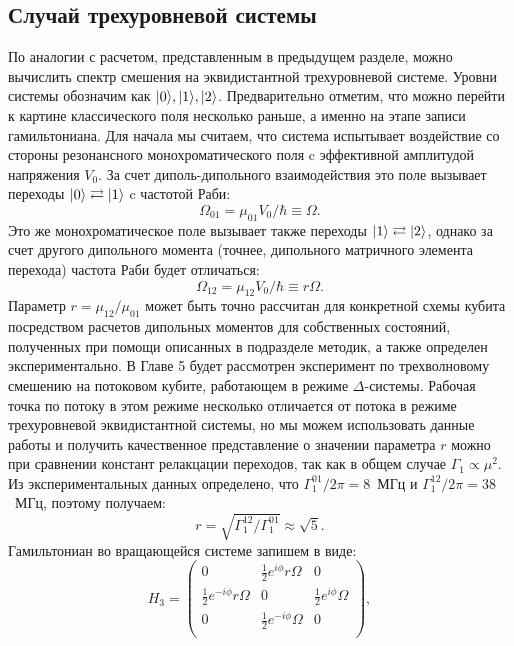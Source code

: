 \subsection{Случай трехуровневой системы}
По аналогии с расчетом, представленным в предыдущем разделе, можно вычислить спектр смешения на эквидистантной трехуровневой системе. Уровни системы обозначим как $\ket{0}\!, \ket{1}\!, \ket{2}$. Предварительно отметим, что можно перейти к картине классического поля несколько раньше, а именно на этапе записи гамильтониана. Для начала мы считаем, что система испытывает воздействие со стороны резонансного монохроматического поля c эффективной амплитудой напряжения $V_0$. За счет диполь-дипольного взаимодействия это поле вызывает переходы $\ket{0}\rightleftarrows\ket{1}$ c частотой Раби:
\begin{equation}
\Omega_{01} = \mu_{01}V_0/\hbar \equiv \Omega.
\end{equation}
Это же монохроматическое поле вызывает также переходы $\ket{1} \rightleftarrows \ket{2}$, однако за счет другого дипольного момента (точнее, дипольного матричного элемента перехода) частота Раби будет отличаться: 
\begin{equation}
\Omega_{12} = \mu_{12}V_0/\hbar \equiv r\Omega.
\end{equation}
Параметр $r = \mu_{12}/\mu_{01}$ может быть точно рассчитан для конкретной схемы кубита посредством расчетов дипольных моментов для собственных состояний, полученных при помощи описанных в подразделе \label{subsec: flux_q} методик, а также определен экспериментально. В Главе 5 будет рассмотрен эксперимент по трехволновому смешению на потоковом кубите, работающем в режиме $\Delta$-системы. Рабочая точка по потоку в этом режиме несколько отличается от потока в режиме трехуровневой эквидистантной системы, но мы можем использовать данные работы \cite{PhysRevA.98.041801} и получить качественное представление о значении параметра $r$ можно при сравнении констант релакцации переходов, так как в общем случае $\Gamma_1 \propto \mu^2$. Из экспериментальных данных определено, что $\Gamma_1^{01}/2\pi = 8$~МГц и $\Gamma_1^{12}/2\pi = 38$~МГц, поэтому получаем:
\begin{equation}
r = \sqrt{\Gamma^{12}_1/\Gamma^{01}_1} \approx \sqrt{5}.
\end{equation} 
Гамильтониан во вращающейся системе запишем в виде:
\begin{equation}
H_3 = \left(
\begin{array}{ccc}
0 & \frac{1}{2} e^{i \phi } r \Omega  & 0 \\
\frac{1}{2} e^{-i \phi } r \Omega  & 0 & \frac{1}{2} e^{i \phi } \Omega  \\
0 & \frac{1}{2} e^{-i \phi } \Omega  & 0 \\
\end{array}
\right),
\end{equation}
